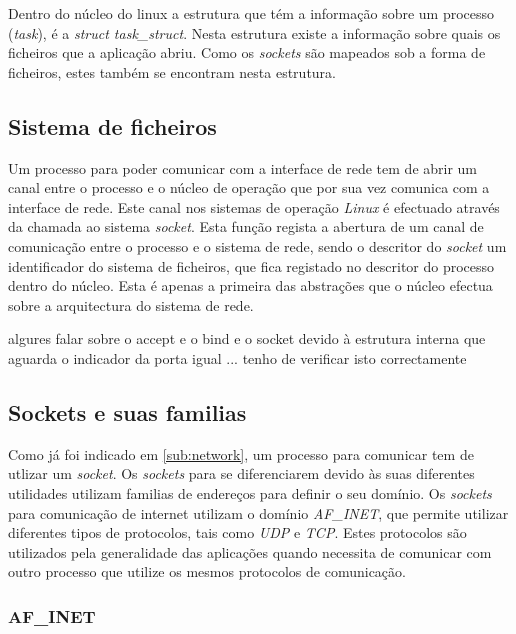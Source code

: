  Dentro do núcleo do linux a estrutura que tém a informação sobre um processo (\textit{task}), é a \textit{struct task\_struct}. 
 Nesta estrutura existe a informação sobre quais os ficheiros que a aplicação abriu.
 Como os \textit{sockets} são mapeados sob a forma de ficheiros, estes também se encontram nesta estrutura.

\subsection{Sistema de ficheiros}

Um processo para poder comunicar com a interface de rede tem de abrir um canal entre o processo e o núcleo de operação que por sua vez comunica com a interface de rede.
 Este canal nos sistemas de operação \textit{Linux} é efectuado através da chamada ao sistema \textit{socket}.
 Esta função regista a abertura de um canal de comunicação entre o processo e o sistema de rede, sendo o descritor do \textit{socket} um identificador do sistema de ficheiros, que fica registado no descritor do processo dentro do núcleo.
 Esta é apenas a primeira das abstrações que o núcleo efectua sobre a arquitectura do sistema de rede.
  
algures falar sobre o accept e o bind e o socket devido à estrutura interna que aguarda o indicador da porta igual ... tenho de verificar isto correctamente


\subsection{Sockets e suas familias}
\label{sub:af_inet}

Como já foi indicado em \ref{sub:network}, um processo para comunicar tem de utlizar um \textit{socket}.
 Os \textit{sockets} para se diferenciarem devido às suas diferentes utilidades utilizam familias de endereços para definir o seu domínio.
 Os \textit{sockets} para comunicação de internet utilizam o domínio \textit{AF\_INET}, que permite utilizar diferentes tipos de protocolos, tais como \textit{UDP} e \textit{TCP}.
 Estes protocolos são utilizados pela generalidade das aplicações quando necessita de comunicar com outro processo que utilize os mesmos protocolos de comunicação.


\subsubsection{AF\_INET}

